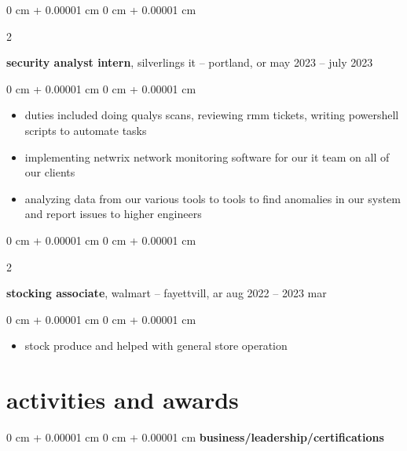 \documentclass[10pt, letterpaper]{article}
\newenvironment{highlights}{
    \begin{itemize}[
        topsep=0.10 cm,
        parsep=0.10 cm,
        partopsep=0pt,
        itemsep=0pt,
        leftmargin=0 cm + 10pt
    ]
}{
    \end{itemize}
} %
\newenvironment{onecolentry}{
    \begin{adjustwidth}{
        0 cm + 0.00001 cm
    }{
        0 cm + 0.00001 cm
    }
}{
    \end{adjustwidth}
} %
\newenvironment{twocolentry}[2][]{
    \onecolentry
    \def\secondcolumn{#2}
    \setcolumnwidth{\fill, 4.5 cm}
    \begin{paracol}{2}
}{
    \switchcolumn \raggedleft \secondcolumn
    \end{paracol}
    \endonecolentry
} %
\begin{document}
        
        \begin{twocolentry}{
            may 2023 – july 2023
        }
            \textbf{security analyst intern}, silverlings it -- portland, or\end{twocolentry}

        \vspace{0.10 cm}
        \begin{onecolentry}
            \begin{highlights}
                \item duties included doing qualys scans, reviewing rmm tickets, writing powershell scripts to automate tasks
                \item implementing netwrix network monitoring software for our it team on all of our clients
                \item analyzing data from our various tools to tools to find anomalies in our system and report issues to higher engineers
            \end{highlights}
        \end{onecolentry}


        \vspace{0.2 cm}

        \begin{twocolentry}{
            aug 2022 –  2023 mar
        }
            \textbf{stocking associate}, walmart -- fayettvill, ar\end{twocolentry}

        \vspace{0.10 cm}
        \begin{onecolentry}
            \begin{highlights}
                \item stock produce and helped with general store operation
            \end{highlights}
        \end{onecolentry}



    
    \section{activities and awards}

        
        \begin{onecolentry}{
        }
            \textbf{business/leadership/certifications}\end{onecolentry}
\end{document}
